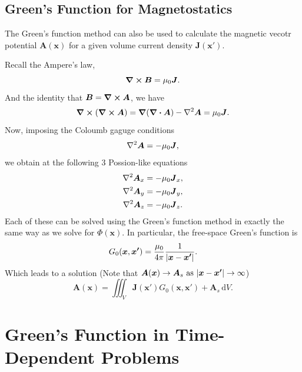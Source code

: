 \documentclass[12pt,english]{article}
\newcommand{\dmr}[1]{\, \mathrm{d}#1} %
\renewcommand{\vec}[1]{\boldsymbol{#1}}
\begin{document}
\subsection{Green's Function for Magnetostatics}
The Green's function method can also be used to calculate the magnetic vecotr potential $\vec{A}(\vec{x})$ for a given volume current density $\vec{J}(\vec{x'})$.

Recall the Ampere's law,
\begin{equation*}
    \curl \vec{B} = \mu_0 \vec{J}.
\end{equation*}
And the identity that $\vec{B} = \curl \vec{A}$, we have
\begin{equation*}
    \curl (\curl \vec{A}) = \grad(\div \vec{A}) - \laplacian \vec{A} = \mu_0 \vec{J}.
\end{equation*}
Now, imposing the Coloumb gaguge conditions
\begin{equation}
    \laplacian \vec{A} = -\mu_0 \vec{J},
\end{equation}
we obtain at the following 3 Possion-like equations
\begin{subequations}
    \begin{align}
        \laplacian \vec{A}_x & = -\mu_0 \vec{J}_x, \\
        \laplacian \vec{A}_y & = -\mu_0 \vec{J}_y, \\
        \laplacian \vec{A}_z & = -\mu_0 \vec{J}_z.
    \end{align}
\end{subequations}
Each of these can be solved using the Green's function method in exactly the same way as we solve for $\Phi(\vec{x})$. In particular, the free-space Green's function is
\begin{equation}
    G_0(\vec{x}, \vec{x'}) = \frac{\mu_0}{4\pi}\frac{1}{\abs{\vec{x}-\vec{x'}}}.
\end{equation}
Which leads to a solution (Note that $\vec{A}(\vec{x}) \to \vec{A}_s \text{ as } \abs{\vec{x} - \vec{x'}} \to \infty$)
\begin{equation}
    \vec{A}(\vec{x}) = \iiint_V \vec{J}(\vec{x'}) G_0(\vec{x}, \vec{x'}) + \vec{A}_s \dmr{V}.
\end{equation}



\section{Green's Function in Time-Dependent Problems}
\end{document}
